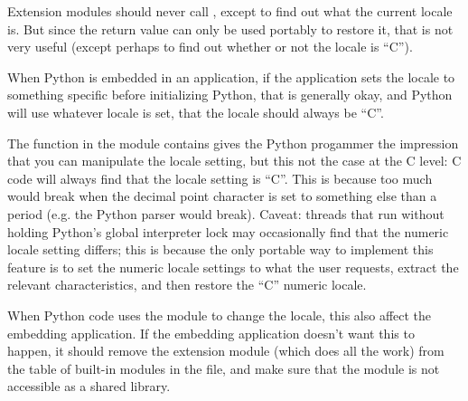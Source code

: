 Extension modules should never call , except to
find out what the current locale is.  But since the return value can
only be used portably to restore it, that is not very useful (except
perhaps to find out whether or not the locale is ``C'').

When Python is embedded in an application, if the application sets the
locale to something specific before initializing Python, that is
generally okay, and Python will use whatever locale is set,
 that the  locale should always be
``C''.

The  function in the  module contains
gives the Python progammer the impression that you can manipulate the
 locale setting, but this not the case at the C
level: C code will always find that the  locale
setting is ``C''.  This is because too much would break when the
decimal point character is set to something else than a period
(e.g. the Python parser would break).  Caveat: threads that run
without holding Python's global interpreter lock may occasionally find
that the numeric locale setting differs; this is because the only
portable way to implement this feature is to set the numeric locale
settings to what the user requests, extract the relevant
characteristics, and then restore the ``C'' numeric locale.

When Python code uses the  module to change the locale,
this also affect the embedding application.  If the embedding
application doesn't want this to happen, it should remove the
 extension module (which does all the work) from the
table of built-in modules in the  file, and make sure
that the  module is not accessible as a shared library.
